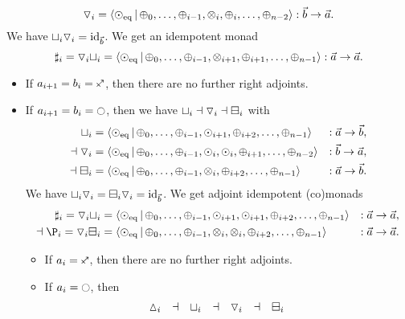 \documentclass[a4paper]{memoir}
\begin{document}
\begin{example}
\begin{itemize}
		\[
			{\triangledown}_i = \mathopen{}\left\langle {\odot}_{\mathrm{eq}} \,\middle|\, {\oplus}_0, \ldots, {\oplus}_{i-1}, {\otimes}_{i}, {\oplus}_{i}, \ldots, {\oplus}_{n-2} \right\rangle\mathclose{} : \vec b \to \vec a.
		\]
		We have ${\sqcup}_i {\triangledown}_i = \mathrm{id}_{\vec b}$. We get an idempotent monad
		\[
			\sharp_i = {\triangledown}_i {\sqcup}_i = \mathopen{}\left\langle {\odot}_{\mathrm{eq}} \,\middle|\, {\oplus}_0, \ldots, {\oplus}_{i-1}, {\otimes}_{i+1}, {\oplus}_{i+1}, \ldots, {\oplus}_{n-1} \right\rangle\mathclose{} : \vec a \to \vec a.
		\]
		\begin{itemize}
			\item If $a_{i+1} = b_i = \ypolar$, then there are no further right adjoints.
			\item If $a_{i+1} = b_i = \npolar$, then we have ${\sqcup}_i \dashv {\triangledown}_i \dashv {\boxminus}_i$ with
			\begin{align*}
				{\sqcup}_i &= \mathopen{}\left\langle {\odot}_{\mathrm{eq}} \,\middle|\, {\oplus}_0, \ldots, {\oplus}_{i-1}, {\odot}_{i+1}, {\oplus}_{i+2}, \ldots, {\oplus}_{n-1} \right\rangle\mathclose{} &: \vec a \to \vec b, \\
				\dashv
				{\triangledown}_i &= \mathopen{}\left\langle {\odot}_{\mathrm{eq}} \,\middle|\, {\oplus}_0, \ldots, {\oplus}_{i-1}, {\odot}_{i}, {\odot}_{i}, {\oplus}_{i+1}, \ldots, {\oplus}_{n-2} \right\rangle\mathclose{} &: \vec b \to \vec a, \\
				\dashv
				{\boxminus}_i &= \mathopen{}\left\langle {\odot}_{\mathrm{eq}} \,\middle|\, {\oplus}_0, \ldots, {\oplus}_{i-1}, {\otimes}_i, {\oplus}_{i+2}, \ldots, {\oplus}_{n-1} \right\rangle\mathclose{} &: \vec a \to \vec b.
			\end{align*}
			We have ${\sqcup}_i {\triangledown}_i = {\boxminus}_i {\triangledown}_i = \mathrm{id}_{\vec b}$. We get adjoint idempotent (co)monads
			\begin{align*}
				\sharp_i = \cohcodisc_i \cohfget_i &= \reshlist{\nonpol_\eqtydeg}{\pospol_0, \ldots, \pospol_{i-1}, \nonpol_{i+1}, \nonpol_{i+1}, \pospol_{i+2}, \ldots, \pospol_{n-1}} &: \vec a \to \vec a, \\
				\dashv
				\coshp_i = \cohcodisc_i \cohcopi_i &= \reshlist{\nonpol_\eqtydeg}{\pospol_0, \ldots, \pospol_{i-1}, \mixpol_{i}, \mixpol_{i}, \pospol_{i+2}, \ldots, \pospol_{n-1}} &: \vec a \to \vec a.
			\end{align*}
			\begin{itemize}
				\item If $a_i = \ypolar$, then there are no further right adjoints.
				\item If $a_i = \npolar$, then
				\[
					\begin{array}{c c c c c c c c c}
						{\vartriangle}_i
						&\dashv&
						{\sqcup}_i
						&\dashv&
						{\triangledown}_i
						&\dashv&
						{\boxminus}_i
						&&
						\\

\end{array}\]
\end{itemize}
\end{itemize}
\end{itemize}
\end{example}
\end{document}
